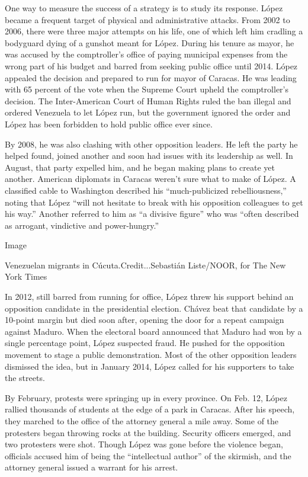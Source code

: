 One way to measure the success of a strategy is to study its response.
López became a frequent target of physical and administrative attacks.
From 2002 to 2006, there were three major attempts on his life, one of
which left him cradling a bodyguard dying of a gunshot meant for López.
During his tenure as mayor, he was accused by the comptroller's office
of paying municipal expenses from the wrong part of his budget and
barred from seeking public office until 2014. López appealed the
decision and prepared to run for mayor of Caracas. He was leading with
65 percent of the vote when the Supreme Court upheld the comptroller's
decision. The Inter-American Court of Human Rights ruled the ban illegal
and ordered Venezuela to let López run, but the government ignored the
order and López has been forbidden to hold public office ever since.

By 2008, he was also clashing with other opposition leaders. He left the
party he helped found, joined another and soon had issues with its
leadership as well. In August, that party expelled him, and he began
making plans to create yet another. American diplomats in Caracas
weren't sure what to make of López. A classified cable to Washington
described his ``much-publicized rebelliousness,'' noting that López
``will not hesitate to break with his opposition colleagues to get his
way.'' Another referred to him as ``a divisive figure'' who was ``often
described as arrogant, vindictive and power-hungry.''

Image

Venezuelan migrants in Cúcuta.Credit...Sebastián Liste/NOOR, for The New
York Times

In 2012, still barred from running for office, López threw his support
behind an opposition candidate in the presidential election. Chávez beat
that candidate by a 10-point margin but died soon after, opening the
door for a repeat campaign against Maduro. When the electoral board
announced that Maduro had won by a single percentage point, López
suspected fraud. He pushed for the opposition movement to stage a public
demonstration. Most of the other opposition leaders dismissed the idea,
but in January 2014, López called for his supporters to take the
streets.

By February, protests were springing up in every province. On Feb. 12,
López rallied thousands of students at the edge of a park in Caracas.
After his speech, they marched to the office of the attorney general a
mile away. Some of the protesters began throwing rocks at the building.
Security officers emerged, and two protesters were shot. Though López
was gone before the violence began, officials accused him of being the
``intellectual author'' of the skirmish, and the attorney general issued
a warrant for his arrest.

